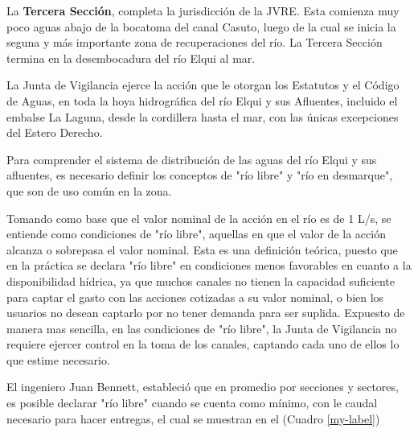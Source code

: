 \documentclass[10pt,]{article}
\begin{document}
La \textbf {Tercera Sección}, completa la jurisdicción de la JVRE. Esta comienza muy poco aguas abajo de la bocatoma del canal Casuto, luego de la cual se inicia la seguna y más importante zona de recuperaciones del río. La Tercera Sección termina en la desembocadura del río Elqui al mar.\bigskip

La Junta de Vigilancia ejerce la acción que le otorgan los Estatutos y el Código de Aguas, en toda la hoya hidrográfica del río Elqui y sus Afluentes, incluido el embalse La Laguna, desde la cordillera hasta el mar, con las únicas excepciones del Estero Derecho.\bigskip

Para comprender el sistema de distribución de las aguas del río Elqui y sus afluentes, es necesario definir los conceptos de "río libre" y "río en desmarque", que son de uso común en la zona.\bigskip

Tomando como base que el valor nominal de la acción en el río es de 1 L/s, se entiende como condiciones de "río libre", aquellas en que el valor de la acción alcanza o sobrepasa el valor nominal. Esta es una definición teórica, puesto que en la práctica se declara "río libre" en condiciones menos favorables en cuanto a la disponibilidad hídrica, ya que muchos canales no tienen la capacidad suficiente para captar el gasto con las acciones cotizadas a su valor nominal, o bien los usuarios no desean captarlo por no tener demanda para ser suplida. Expuesto de manera mas sencilla, en las condiciones de "río libre", la Junta de Vigilancia no requiere ejercer control en la toma de los canales, captando cada uno de ellos lo que estime necesario.\bigskip

El ingeniero Juan Bennett, estableció que en promedio por secciones y sectores, es posible declarar "río libre" cuando se cuenta como mínimo, con le caudal necesario para hacer entregas, el cual se muestran en el (Cuadro \ref{my-label})
\end{document}
